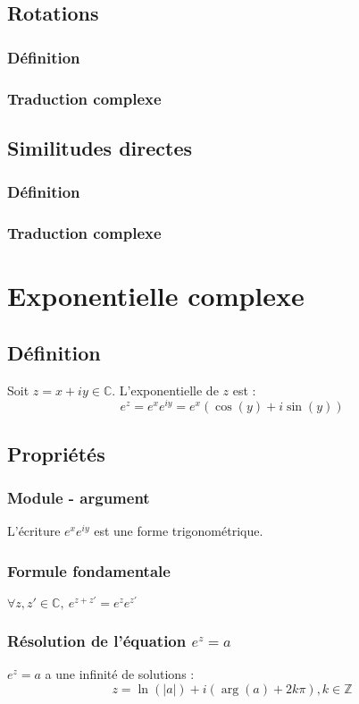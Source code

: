 \documentclass[12pt,a4paper,french]{book}
\begin{document}
		\subsection{Rotations}
			\subsubsection{Définition}
			\subsubsection{Traduction complexe}
		\subsection{Similitudes directes}
			\subsubsection{Définition}
			\subsubsection{Traduction complexe}
	\section{Exponentielle complexe}
		\subsection{Définition}
		Soit $z = x+iy \in \mathbb{C}.$ L'exponentielle de $z$ est :
		\[e^{z} = e^{x}e^{iy} = e^{x}(\cos(y)+i\sin(y))\] 
		\subsection{Propriétés}
			\subsubsection{Module - argument}
			L'écriture $e^{x}e^{iy}$ est une forme trigonométrique.
			\subsubsection{Formule fondamentale}
			$\forall z,z' \in \mathbb{C}, \ e^{z+z'} = e^{z}e^{z'}$
			\subsubsection{Résolution de l'équation $e^{z} = a$}
			$e^{z} = a$ a une infinité de solutions : \[z = \ln(\left|a\right|) + i(\arg(a)+2k\pi), k\in \mathbb{Z} \]
\end{document}
